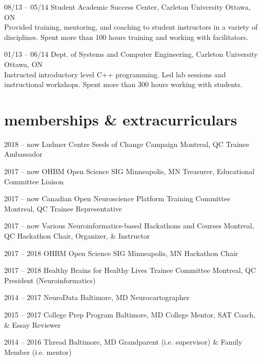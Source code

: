 \documentclass[]{friggeri-cv} %
\begin{document}
\begin{entrylist}
\begin{entrylist}
\entry
{08/13 -- 05/14}
{Student Academic Success Center, Carleton University}
{Ottawa, ON}
{\\
Provided training, mentoring, and coaching to student instructors in a variety of disciplines. Spent more than 100
hours training and working with facilitators.}

\entry
{01/13 -- 06/14}
{Dept. of Systems and Computer Engineering, Carleton University}
{Ottawa, ON}
{\\
Instructed introductory level C++ programming. Led lab sessions and instructional workshops. Spent more than 300 hours
working with students.}
\end{entrylist}


\section{memberships \& extracurriculars}

\begin{entrylist}
\entry
{2018 -- now}
{Ludmer Centre Seeds of Change Campaign}
{Montreal, QC}
{Trainee Ambassador}

\entry
{2017 -- now}
{OHBM Open Science SIG}
{Minneapolis, MN}
{Treasurer, Educational Committee Liaison}

\entry
{2017 -- now}
{Canadian Open Neuroscience Platform Training Committee}
{Montreal, QC}
{Trainee Representative}

\entry
{2017 -- now}
{Various Neuroinformatics-based Hackathons and Courses}
{Montreal, QC}
{Hackathon Chair, Organizer, \& Instructor}

\entry
{2017 -- 2018}
{OHBM Open Science SIG}
{Minneapolis, MN}
{Hackathon Chair}

\entry
{2017 -- 2018}
{Healthy Brains for Healthy Lives Trainee Committee}
{Montreal, QC}
{President (Neuroinformatics)}

\entry
{2014 -- 2017}
{NeuroData}
{Baltimore, MD}
{Neurocartographer}

\entry
{2015 -- 2017}
{College Prep Program}
{Baltimore, MD}
{College Mentor, SAT Coach, \& Essay Reviewer}

\entry
{2014 -- 2016}
{Thread}
{Baltimore, MD}
{Grandparent (i.e. supervisor) \& Family Member (i.e. mentor) }


\end{entrylist}
\end{entrylist}
\end{document}
